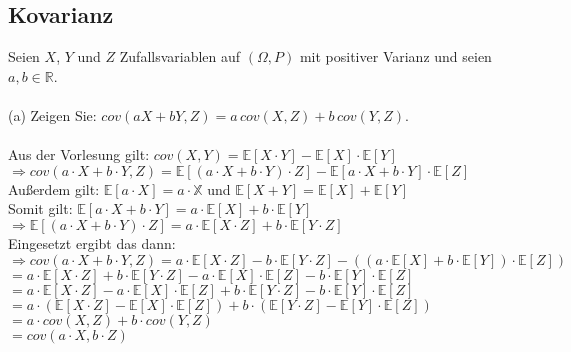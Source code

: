 \documentclass[a4paper]{article}
\begin{document}
\subsection{Kovarianz}
Seien $X$, $Y$ und $Z$ Zufallsvariablen auf $(\Omega, P)$ mit positiver Varianz und seien $a, b \in \mathbb{R}$.\\\\
(a) Zeigen Sie: $cov(aX + bY, Z) = a\, cov(X, Z) + b\,  cov(Y, Z)$.\\\\
Aus der Vorlesung gilt: $cov(X,Y) = \mathbb{E}[X \cdot Y] - \mathbb{E}[X]\cdot \mathbb{E}[Y]$\\
$\Rightarrow cov(a \cdot X + b \cdot Y, Z) = \mathbb{E}[(a \cdot X + b \cdot Y) \cdot Z] - \mathbb{E}[a \cdot X + b \cdot Y] \cdot \mathbb{E}[Z]$\\
Außerdem gilt: $\mathbb{E}[a \cdot X] = a \cdot \mathbb{X}$ und $\mathbb{E}[X + Y] = \mathbb{E}[X] + \mathbb{E}[Y]$\\
Somit gilt: $\mathbb{E}[a \cdot X + b  \cdot Y] = a \cdot \mathbb{E}[X] + b \cdot \mathbb{E}[Y]$\\
$\Rightarrow \mathbb{E}[(a \cdot X + b \cdot Y) \cdot Z] = a \cdot \mathbb{E}[X \cdot Z] + b \cdot \mathbb{E}[Y \cdot Z]$\\
Eingesetzt ergibt das dann:\\
$\Rightarrow cov(a \cdot X + b \cdot Y, Z) = a \cdot \mathbb{E}[X \cdot Z] - b \cdot \mathbb{E}[Y \cdot Z] - ((a \cdot \mathbb{E}[X] + b \cdot \mathbb{E}[Y]) \cdot \mathbb{E}[Z])$\\
\hspace*{3.57cm}$= a \cdot \mathbb{E}[X \cdot Z] + b \cdot \mathbb{E}[Y \cdot Z] - a \cdot \mathbb{E}[X] \cdot \mathbb{E}[Z] - b \cdot \mathbb{E}[Y] \cdot \mathbb{E}[Z]$\\
\hspace*{3.57cm}$= a \cdot \mathbb{E}[X \cdot Z] - a \cdot \mathbb{E}[X] \cdot \mathbb{E}[Z] + b \cdot \mathbb{E}[Y \cdot Z] - b \cdot \mathbb{E}[Y] \cdot \mathbb{E}[Z]$\\
\hspace*{3.57cm}$= a \cdot (\mathbb{E}[X \cdot Z] - \mathbb{E}[X] \cdot \mathbb{E}[Z]) + b \cdot (\mathbb{E}[Y \cdot Z] - \mathbb{E}[Y] \cdot \mathbb{E}[Z])$\\
\hspace*{3.57cm}$= a \cdot cov(X, Z) + b \cdot cov(Y, Z)$\\
\hspace*{3,57cm}$= cov(a \cdot X, b \cdot Z)$
\\\\
\end{document}
